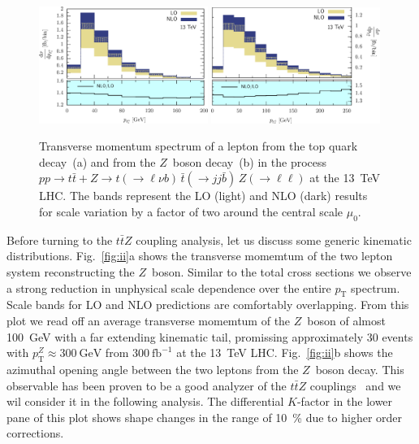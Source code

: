 \documentclass[preprint]{JHEP3}
\newcommand{\GeV}{\mathrm{GeV}}
\newcommand{\pT}{p_{\mathrm{T}}}
\def\ttbZ{t\bar{t}Z}
\def\ttb{t\bar{t}}
\begin{document}
\begin{figure}[t]
\centering %
\includegraphics[width=0.49\textwidth]{./LHC_53_Fig01.eps}
\hfill
\includegraphics[width=0.49\textwidth]{./LHC_53_Fig03.eps}
\caption{\label{fig:iii} Transverse momentum spectrum of a lepton from the top quark decay~(a) and from the $Z$~boson decay~(b) 
in the process $pp \to \ttb + Z \to t(\to \ell \nu b) \, \bar{t} (\to jj \bar{b}) \, Z(\to \ell \ell)$ at the 13~TeV LHC.
The bands represent the LO (light) and NLO (dark) results for scale variation by a factor of two around the central scale $\mu_0$.}
\end{figure}

Before turning to the $\ttbZ$ coupling analysis, let us discuss some generic kinematic distributions.
Fig.~\ref{fig:ii}a shows the transverse momemtum of the two lepton system reconstructing the $Z$~boson.
Similar to the total cross sections we observe a strong reduction in unphysical scale dependence over the entire $\pT$ spectrum.
Scale bands for LO and NLO predictions are comfortably overlapping. 
From this plot we read off an average transverse momemtum of the $Z$~boson of almost 100~GeV with a far extending kinematic tail,
promissing approximately 30 events with $\pT^Z \approx 300~\GeV$ from $300~\mathrm{fb}^{-1}$ at the 13~TeV LHC. 
Fig.~\ref{fig:ii}b shows the azimuthal opening angle between the two leptons from the $Z$~boson decay.
This observable has been proven to be a good analyzer of the $\ttbZ$ couplings~\cite{Baur:2004uw} and we wil consider it in the following analysis.
The differential $K$-factor in the lower pane of this plot shows shape changes in the range of 10~\% due to higher order corrections.
\end{document}
